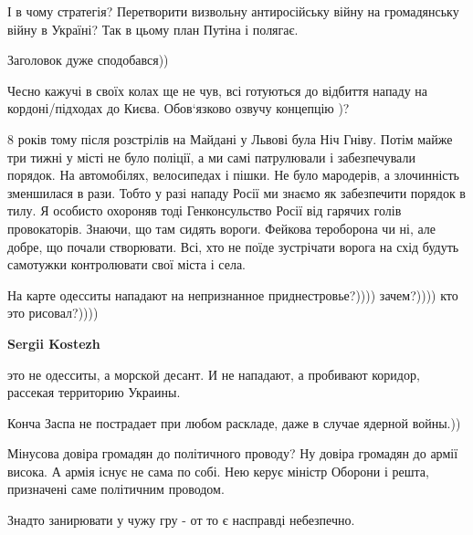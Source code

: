 \begin{itemize}

І в чому стратегія? Перетворити визвольну антиросійську війну на громадянську
війну в Україні? Так в цьому план Путіна і полягає.


Заголовок дуже сподобався))

Чесно кажучі в своїх колах ще не чув, всі готуються до відбиття нападу на
кордоні/підходах до Києва. Обов‘язково озвучу концепцію )?


8 років тому після розстрілів на Майдані у Львові була Ніч Гніву. Потім майже
три тижні у місті не було поліції, а ми самі патрулювали і забезпечували
порядок. На автомобілях, велосипедах і пішки. Не було мародерів, а злочинність
зменшилася в рази. Тобто у разі нападу Росії ми знаємо як забезпечити порядок в
тилу. Я особисто охороняв тоді Генконсульство Росії від гарячих голів
провокаторів. Знаючи, що там сидять вороги. Фейкова тероборона чи ні, але
добре, що почали створювати. Всі, хто не поїде зустрічати ворога на схід будуть
самотужки контролювати свої міста і села.


На карте одесситы нападают на непризнанное приднестровье?)))) зачем?)))) кто
это рисовал?))))

\textbf{Sergii Kostezh} 

это не одесситы, а морской десант. И не нападают, а пробивают коридор, рассекая
территорию Украины.

Конча Заспа не пострадает при любом раскладе, даже в случае ядерной войны.))


Мінусова довіра громадян до політичного проводу? Ну довіра громадян до армії
висока. А армія існує не сама по собі. Нею керує міністр Оборони і решта,
призначені саме політичним проводом.

Знадто занирювати у чужу гру - от то є насправді небезпечно.

\end{itemize} %
